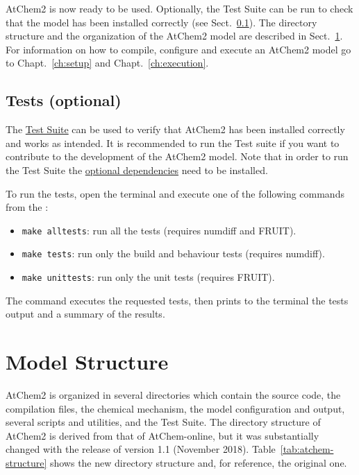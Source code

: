 AtChem2 is now ready to be used. Optionally, the Test Suite can be run
to check that the model has been installed correctly (see
Sect.~\ref{subsec:tests-optional}). The directory structure and the
organization of the AtChem2 model are described in
Sect.~\ref{sec:model-structure}. For information on how to compile,
configure and execute an AtChem2 model go to Chapt.~\ref{ch:setup} and
Chapt.~\ref{ch:execution}.

\subsection{Tests (optional)} \label{subsec:tests-optional}

The \hyperref[sec:test-suite]{Test Suite} can be used to verify that
AtChem2 has been installed correctly and works as intended. It is
recommended to run the Test suite if you want to contribute to the
development of the AtChem2 model. Note that in order to run the Test
Suite the \hyperref[subsec:optional-dependencies]{optional dependencies}
need to be installed.

To run the tests, open the terminal and execute one of the following
commands from the \maindir:

\begin{itemize}
\item \verb|make alltests|: run all the tests (requires numdiff and
  FRUIT).
\item \verb|make tests|: run only the build and behaviour tests
  (requires numdiff).
\item \verb|make unittests|: run only the unit tests (requires
  FRUIT).
\end{itemize}

The command executes the requested tests, then prints to the terminal
the tests output and a summary of the results.

\section{Model Structure} \label{sec:model-structure}

AtChem2 is organized in several directories which contain the source
code, the compilation files, the chemical mechanism, the model
configuration and output, several scripts and utilities, and the Test
Suite. The directory structure of AtChem2 is derived from that of
AtChem-online, but it was substantially changed with the release of
version 1.1 (November 2018). Table~\ref{tab:atchem-structure} shows
the new directory structure and, for reference, the original one.

